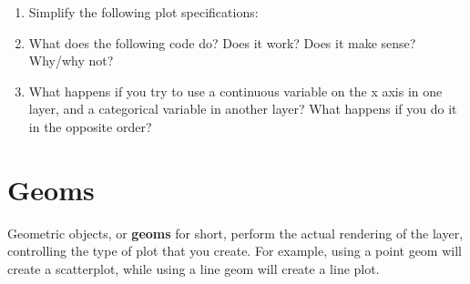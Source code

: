 \begin{enumerate}
\def\labelenumi{\arabic{enumi}.}
\item
  Simplify the following plot specifications:

\begin{Shaded}
\begin{Highlighting}[]
\StringTok{ }
\StringTok{  }\NormalTok{(}

\NormalTok{() +}\StringTok{ }
\StringTok{ }\NormalTok{(} \NormalTok{(}   
\StringTok{ }\NormalTok{(}  

\StringTok{ }
\StringTok{  }\NormalTok{(}\NormalTok{(} 
\end{Highlighting}
\end{Shaded}
\item
  What does the following code do? Does it work? Does it make sense?
  Why/why not?

\begin{Shaded}
\begin{Highlighting}[]
\StringTok{  }\NormalTok{(}\StringTok{ }
\StringTok{  }\NormalTok{(}
\end{Highlighting}
\end{Shaded}
\item
  What happens if you try to use a continuous variable on the x axis in
  one layer, and a categorical variable in another layer? What happens
  if you do it in the opposite order?
\end{enumerate}

\section{Geoms}\label{sec:geom}

Geometric objects, or \textbf{geoms} for short, perform the actual
rendering of the layer, controlling the type of plot that you create.
For example, using a point geom will create a scatterplot, while using a
line geom will create a line plot.

